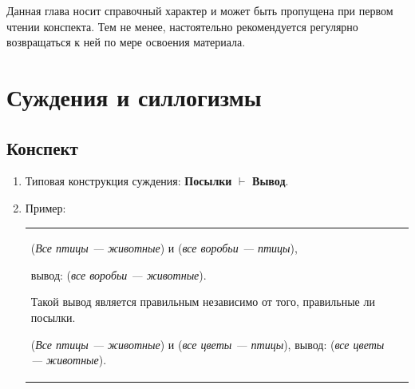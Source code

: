 \setcounter{chapter}{-1}


Данная глава носит справочный характер и может быть пропущена при первом чтении конспекта. Тем не менее, настоятельно рекомендуется регулярно возвращаться к ней по мере освоения материала.


\section{Суждения и силлогизмы}

\subsection{Конспект}
\begin{enumerate}\setlength{\itemsep}{1pt}
\item Типовая конструкция суждения: \textbf{Посылки} $\vdash$ \textbf{Вывод}.
\item Пример:

\begin{tabular}{lr}
\begin{minipage}[b]{0.6\linewidth}
(\textit{Все птицы --- животные}) и (\textit{все воробьи --- птицы}),

вывод: (\textit{все воробьи --- животные}).

Такой вывод является правильным независимо от того, правильные ли посылки.

(\textit{Все птицы --- животные}) и (\textit{все цветы --- птицы}), вывод: (\textit{все цветы --- животные}).


\end{minipage}
\end{tabular}
\end{enumerate}

